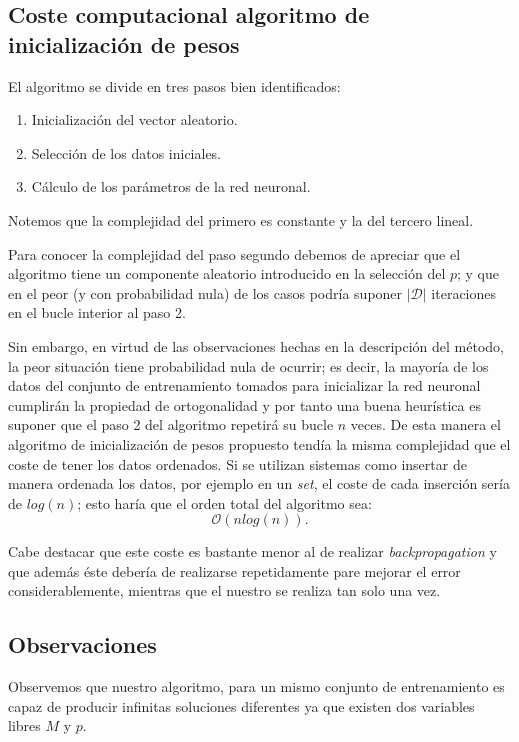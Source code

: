 \subsection{Coste computacional algoritmo de inicialización de pesos}
\label{ch07:coste-computacional-algoritmo-propio}
El algoritmo se divide en tres pasos bien identificados: 
\begin{enumerate}
    \item Inicialización del vector aleatorio.
    \item Selección de los datos iniciales.
    \item Cálculo de los parámetros de la red neuronal.
\end{enumerate}
Notemos que la complejidad del primero es constante y
la del tercero lineal. 

Para conocer la complejidad 
del paso segundo debemos de apreciar que el algoritmo 
tiene un componente aleatorio introducido en la selección del $p$; 
y que en el peor (y con probabilidad nula) de los casos podría suponer
$|\mathcal{D}|$ iteraciones en el bucle interior al paso 2.  

Sin embargo, en virtud de las observaciones hechas en la 
descripción del método, la peor situación tiene probabilidad nula de ocurrir;
es decir,
la mayoría de los datos del conjunto de entrenamiento tomados para inicializar la red neuronal cumplirán la propiedad de ortogonalidad y por tanto una buena 
heurística es suponer 
que  el paso 2 del algoritmo repetirá su bucle $n$ veces. 
De esta manera el algoritmo de inicialización de pesos propuesto tendía la misma complejidad que el coste 
de tener los datos ordenados. 
Si se utilizan sistemas como insertar de manera ordenada los datos, por ejemplo en un \textit{set}, 
el coste de cada inserción sería de $log(n)$; esto haría que el orden total del algoritmo sea: 
\begin{equation}
    \mathcal{O}(n log(n)).
\end{equation}

Cabe destacar que este coste es bastante menor al de realizar \textit{backpropagation} 
y que además éste debería de realizarse repetidamente pare mejorar el error considerablemente, 
 mientras que el nuestro se realiza tan solo una vez. 


\subsection{Observaciones }

Observemos que nuestro algoritmo, para un mismo conjunto de entrenamiento  es capaz de producir infinitas soluciones 
diferentes ya que 
existen dos variables libres $M$ y $p$. 

